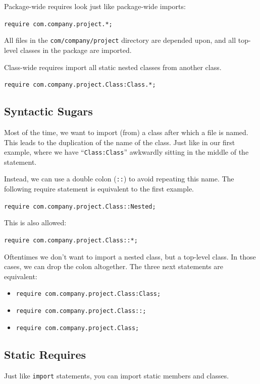 Package-wide requires look just like package-wide imports:

\texttt{require com.company.project.*;}

All files in the \texttt{com/company/project} directory are depended upon, and
all top-level classes in the package are imported.

Class-wide requires import all static nested classes from another class.

\texttt{require com.company.project.Class:Class.*;}

\subsection{Syntactic Sugars}

Most of the time, we want to import (from) a class after which a file is
named. This leads to the duplication of the name of the class. Just like in our
first example, where we have ``\texttt{Class:Class}'' awkwardly sitting in the
middle of the statement.

Instead, we can use a double colon (\texttt{::}) to avoid repeating this
name. The following require statement is equivalent to the first example.

\texttt{require com.company.project.Class::Nested;}

This is also allowed:

\texttt{require com.company.project.Class::*;}

Oftentimes we don't want to import a nested class, but a top-level class. In
those cases, we can drop the colon altogether. The three next statements are
equivalent:

\begin{itemize}
\item \texttt{require com.company.project.Class:Class;}
\item \texttt{require com.company.project.Class::;}
\item \texttt{require com.company.project.Class;}
\end{itemize}

\subsection{Static Requires}

Just like \texttt{import} statements, you can import static members and classes.

